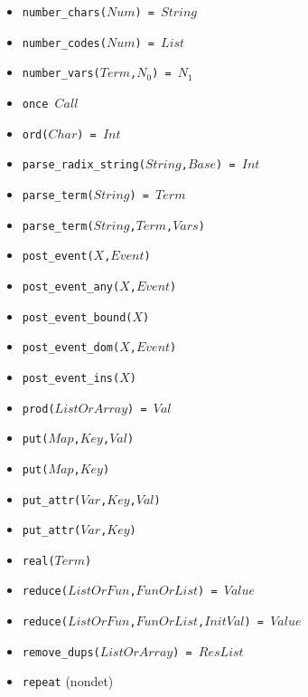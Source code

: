 \documentclass[10pt]{article}
\begin{document}
\begin{multicols}{2}
\begin{scriptsize}
\begin{itemize}
    \item \texttt{number\_chars($Num$) = $String$} 
    \item \texttt{number\_codes($Num$) = $List$} 
    \item \texttt{number\_vars($Term$,$N_0$) = $N_1$}
    \item \texttt{once $Call$}
    \item \texttt{ord($Char$) = $Int$} 
    \item \texttt{parse\_radix\_string($String$,$Base$) = $Int$}
    \item \texttt{parse\_term($String$) = $Term$}
    \item \texttt{parse\_term($String$,$Term$,$Vars$)}
    \item \texttt{post\_event($X$,$Event$)}
    \item \texttt{post\_event\_any($X$,$Event$)}
    \item \texttt{post\_event\_bound($X$)}
    \item \texttt{post\_event\_dom($X$,$Event$)}
    \item \texttt{post\_event\_ins($X$)}
    \item \texttt{prod($ListOrArray$) = $Val$}
    \item \texttt{put($Map$,$Key$,$Val$)} 
    \item \texttt{put($Map$,$Key$)} 
    \item \texttt{put\_attr($Var$,$Key$,$Val$)} 
    \item \texttt{put\_attr($Var$,$Key$)} 
    \item \texttt{real($Term$)} 
    \item \texttt{reduce($ListOrFun$,$FunOrList$) = $Value$} 
    \item \texttt{reduce($ListOrFun$,$FunOrList$,$InitVal$) = $Value$} 
    \item \texttt{remove\_dups($ListOrArray$) = $ResList$} 
    \item \texttt{repeat} (nondet)

\end{itemize}
\end{scriptsize}
\end{multicols}
\end{document}
